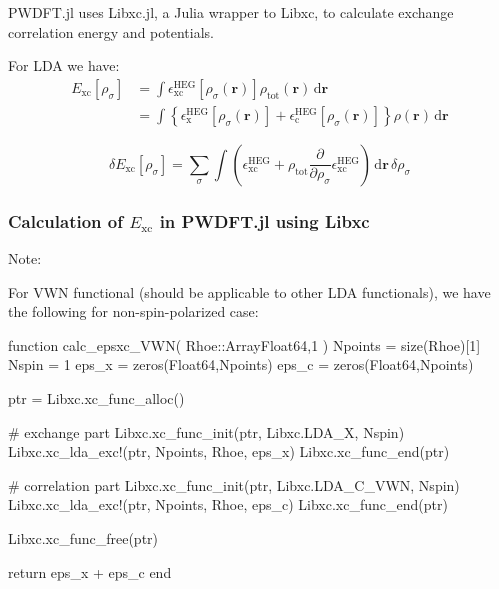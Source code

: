 \textsf{PWDFT.jl} uses \textsf{Libxc.jl}\cite{Libxc.jl}, a Julia wrapper to
\textsf{Libxc}\cite{Marques2012,Lehtola2018}, to calculate exchange correlation
energy and potentials.

For LDA we have:
\begin{align}
E_{\mathrm{xc}}\left[\rho_{\sigma}\right] & = \int \epsilon^{\mathrm{HEG}}_{\mathrm{xc}}
\left[ \rho_{\sigma}(\mathbf{r}) \right]
\rho_{\mathrm{tot}}(\mathbf{r})\, \mathrm{d}\mathbf{r} \\
& = \int \left\{
\epsilon^{\mathrm{HEG}}_{\mathrm{x}} \left[ \rho_{\sigma}(\mathbf{r}) \right] +
\epsilon^{\mathrm{HEG}}_{\mathrm{c}} \left[ \rho_{\sigma}(\mathbf{r}) \right]
\right\}
\rho(\mathbf{r})\, \mathrm{d}\mathbf{r}
\end{align}

\begin{equation}
\delta E_{\mathrm{xc}}\left[\rho_{\sigma}\right] =
\sum_{\sigma} \int
\left(
\epsilon^{\mathrm{HEG}}_{\mathrm{xc}} +
\rho_{\mathrm{tot}} \frac{\partial}{\partial \rho_{\sigma}} \epsilon^{\mathrm{HEG}}_{\mathrm{xc}}
\right)
\, \mathrm{d}\mathbf{r}\,\delta \rho_{\sigma}
\end{equation}


\subsubsection{Calculation of $E_{\mathrm{xc}}$ in \textsf{PWDFT.jl} using Libxc}

Note:

For VWN functional (should be applicable to other LDA functionals), we have the following
for non-spin-polarized case:
%
\begin{juliacode}
function calc_epsxc_VWN( Rhoe::Array{Float64,1} )
    Npoints = size(Rhoe)[1]
    Nspin = 1
    eps_x = zeros(Float64,Npoints)
    eps_c = zeros(Float64,Npoints)

    ptr = Libxc.xc_func_alloc()

    # exchange part
    Libxc.xc_func_init(ptr, Libxc.LDA_X, Nspin)
    Libxc.xc_lda_exc!(ptr, Npoints, Rhoe, eps_x)
    Libxc.xc_func_end(ptr)

    # correlation part
    Libxc.xc_func_init(ptr, Libxc.LDA_C_VWN, Nspin)
    Libxc.xc_lda_exc!(ptr, Npoints, Rhoe, eps_c)
    Libxc.xc_func_end(ptr)

    Libxc.xc_func_free(ptr)

    return eps_x + eps_c
end
\end{juliacode}


